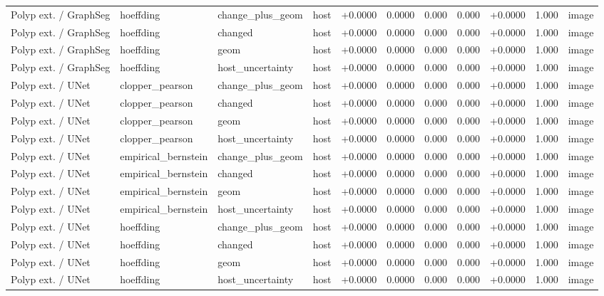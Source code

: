 \begin{table}[t]
\begin{tabular}{lllllllllll}
Polyp ext. / GraphSeg & hoeffding & change\_plus\_geom & host & +0.0000 & 0.0000 & 0.000 & 0.000 & +0.0000 & 1.000 & image \\
Polyp ext. / GraphSeg & hoeffding & changed & host & +0.0000 & 0.0000 & 0.000 & 0.000 & +0.0000 & 1.000 & image \\
Polyp ext. / GraphSeg & hoeffding & geom & host & +0.0000 & 0.0000 & 0.000 & 0.000 & +0.0000 & 1.000 & image \\
Polyp ext. / GraphSeg & hoeffding & host\_uncertainty & host & +0.0000 & 0.0000 & 0.000 & 0.000 & +0.0000 & 1.000 & image \\
Polyp ext. / UNet & clopper\_pearson & change\_plus\_geom & host & +0.0000 & 0.0000 & 0.000 & 0.000 & +0.0000 & 1.000 & image \\
Polyp ext. / UNet & clopper\_pearson & changed & host & +0.0000 & 0.0000 & 0.000 & 0.000 & +0.0000 & 1.000 & image \\
Polyp ext. / UNet & clopper\_pearson & geom & host & +0.0000 & 0.0000 & 0.000 & 0.000 & +0.0000 & 1.000 & image \\
Polyp ext. / UNet & clopper\_pearson & host\_uncertainty & host & +0.0000 & 0.0000 & 0.000 & 0.000 & +0.0000 & 1.000 & image \\
Polyp ext. / UNet & empirical\_bernstein & change\_plus\_geom & host & +0.0000 & 0.0000 & 0.000 & 0.000 & +0.0000 & 1.000 & image \\
Polyp ext. / UNet & empirical\_bernstein & changed & host & +0.0000 & 0.0000 & 0.000 & 0.000 & +0.0000 & 1.000 & image \\
Polyp ext. / UNet & empirical\_bernstein & geom & host & +0.0000 & 0.0000 & 0.000 & 0.000 & +0.0000 & 1.000 & image \\
Polyp ext. / UNet & empirical\_bernstein & host\_uncertainty & host & +0.0000 & 0.0000 & 0.000 & 0.000 & +0.0000 & 1.000 & image \\
Polyp ext. / UNet & hoeffding & change\_plus\_geom & host & +0.0000 & 0.0000 & 0.000 & 0.000 & +0.0000 & 1.000 & image \\
Polyp ext. / UNet & hoeffding & changed & host & +0.0000 & 0.0000 & 0.000 & 0.000 & +0.0000 & 1.000 & image \\
Polyp ext. / UNet & hoeffding & geom & host & +0.0000 & 0.0000 & 0.000 & 0.000 & +0.0000 & 1.000 & image \\
Polyp ext. / UNet & hoeffding & host\_uncertainty & host & +0.0000 & 0.0000 & 0.000 & 0.000 & +0.0000 & 1.000 & image \\
\bottomrule
\end{tabular}
\end{table}
